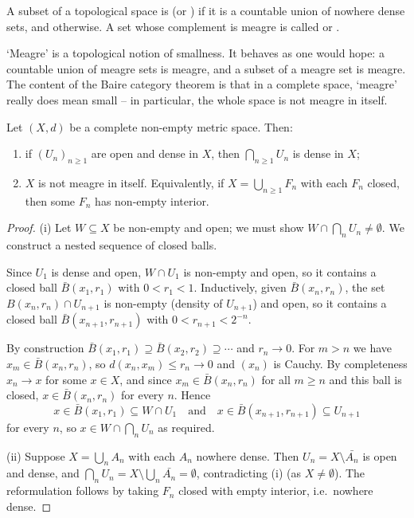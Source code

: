 \begin{definition}[Meagre]
	A subset of a topological space is  (or ) if it is a countable union of nowhere dense sets, and  otherwise. A set whose complement is meagre is called  or .
\end{definition}

`Meagre' is a topological notion of smallness. It behaves as one would hope: a countable union of meagre sets is meagre, and a subset of a meagre set is meagre. The content of the Baire category theorem is that in a complete space, `meagre' really does mean small -- in particular, the whole space is not meagre in itself.

\begin{theorem}
	Let $(X,d)$ be a complete non-empty metric space. Then:
	\begin{enumerate}[label=(\roman*)]
		\item if $(U_n)_{n \geq 1}$ are open and dense in $X$, then $\bigcap_{n \geq 1} U_n$ is dense in $X$;
		\item $X$ is not meagre in itself. Equivalently, if $X = \bigcup_{n\geq 1} F_n$ with each $F_n$ closed, then some $F_n$ has non-empty interior.
	\end{enumerate}
\end{theorem}

\begin{proof}
	(i) Let $W \subseteq X$ be non-empty and open; we must show $W \cap \bigcap_n U_n \neq \emptyset$. We construct a nested sequence of closed balls.

	Since $U_1$ is dense and open, $W \cap U_1$ is non-empty and open, so it contains a closed ball $\bar B(x_1, r_1)$ with $0 < r_1 < 1$. Inductively, given $\bar{B}(x_n, r_n)$, the set $B(x_n, r_n) \cap U_{n+1}$ is non-empty (density of $U_{n+1}$) and open, so it contains a closed ball $\bar B(x_{n+1}, r_{n+1})$ with $0 < r_{n+1} < 2^{-n}$.

	By construction $\bar B(x_1,r_1) \supseteq \bar B(x_2,r_2) \supseteq \cdots$ and $r_n \to 0$. For $m > n$ we have $x_m \in \bar B(x_n, r_n)$, so $d(x_n, x_m) \leq r_n \to 0$ and $(x_n)$ is Cauchy. By completeness $x_n \to x$ for some $x \in X$, and since $x_m \in \bar B(x_n, r_n)$ for all $m \geq n$ and this ball is closed, $x \in \bar B(x_n, r_n)$ for every $n$. Hence
	$$x \in \bar B(x_1, r_1) \subseteq W \cap U_1 \quad \text{and} \quad x \in \bar B(x_{n+1},r_{n+1}) \subseteq U_{n+1}$$
	for every $n$, so $x \in W \cap \bigcap_n U_n$ as required.

	(ii) Suppose $X = \bigcup_n A_n$ with each $A_n$ nowhere dense. Then $U_n = X \setminus \bar{A_n}$ is open and dense, and $\bigcap_n U_n = X \setminus \bigcup_n \bar{A_n} = \emptyset$, contradicting (i) (as $X \neq \emptyset$). The reformulation follows by taking $F_n$ closed with empty interior, i.e.\ nowhere dense.
\end{proof}

